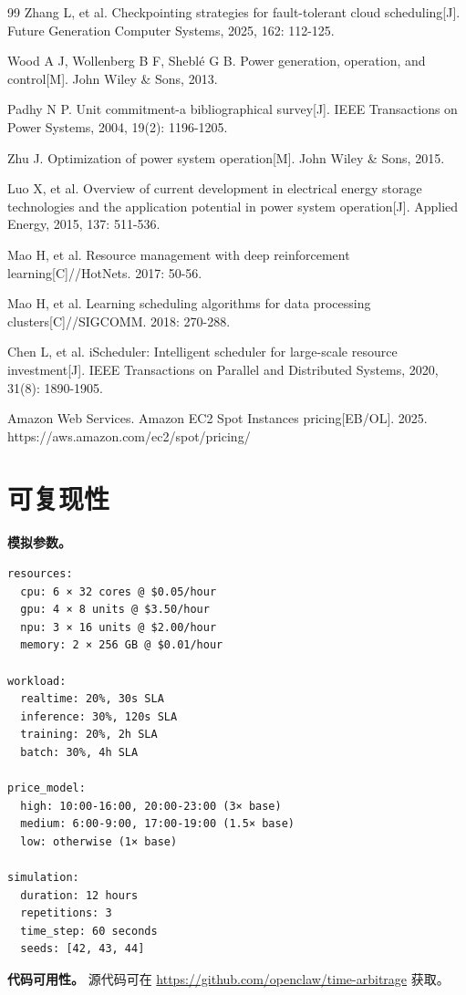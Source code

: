 \documentclass[10pt,a4paper]{article}
\begin{document}
\begin{thebibliography}{99}
Zhang L, et al. Checkpointing strategies for fault-tolerant cloud scheduling[J]. Future Generation Computer Systems, 2025, 162: 112-125.

Wood A J, Wollenberg B F, Sheblé G B. Power generation, operation, and control[M]. John Wiley \& Sons, 2013.

Padhy N P. Unit commitment-a bibliographical survey[J]. IEEE Transactions on Power Systems, 2004, 19(2): 1196-1205.

Zhu J. Optimization of power system operation[M]. John Wiley \& Sons, 2015.

Luo X, et al. Overview of current development in electrical energy storage technologies and the application potential in power system operation[J]. Applied Energy, 2015, 137: 511-536.

Mao H, et al. Resource management with deep reinforcement learning[C]//HotNets. 2017: 50-56.

Mao H, et al. Learning scheduling algorithms for data processing clusters[C]//SIGCOMM. 2018: 270-288.

Chen L, et al. iScheduler: Intelligent scheduler for large-scale resource investment[J]. IEEE Transactions on Parallel and Distributed Systems, 2020, 31(8): 1890-1905.

Amazon Web Services. Amazon EC2 Spot Instances pricing[EB/OL]. 2025. https://aws.amazon.com/ec2/spot/pricing/

\end{thebibliography}

\appendix
\section{可复现性}

\textbf{模拟参数。}
\begin{verbatim}
resources:
  cpu: 6 × 32 cores @ $0.05/hour
  gpu: 4 × 8 units @ $3.50/hour
  npu: 3 × 16 units @ $2.00/hour
  memory: 2 × 256 GB @ $0.01/hour

workload:
  realtime: 20%, 30s SLA
  inference: 30%, 120s SLA
  training: 20%, 2h SLA
  batch: 30%, 4h SLA

price_model:
  high: 10:00-16:00, 20:00-23:00 (3× base)
  medium: 6:00-9:00, 17:00-19:00 (1.5× base)
  low: otherwise (1× base)

simulation:
  duration: 12 hours
  repetitions: 3
  time_step: 60 seconds
  seeds: [42, 43, 44]
\end{verbatim}

\textbf{代码可用性。} 源代码可在 \url{https://github.com/openclaw/time-arbitrage} 获取。
\end{document}

